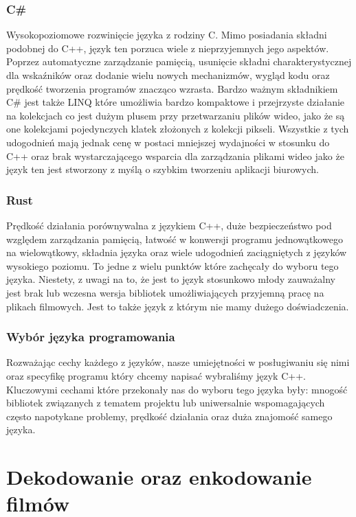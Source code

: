 \documentclass[twoside]{projektInzynierskiMS}
\begin{document}
\subsubsection{C\#}
Wysokopoziomowe rozwinięcie języka z rodziny C. Mimo posiadania składni podobnej do C++, język ten porzuca wiele z nieprzyjemnych jego aspektów. Poprzez automatyczne zarządzanie pamięcią, usunięcie składni charakterystycznej dla wskaźników oraz dodanie wielu nowych mechanizmów, wygląd kodu oraz prędkość tworzenia programów znacząco wzrasta. Bardzo ważnym składnikiem C\# jest także LINQ które umożliwia bardzo kompaktowe i przejrzyste działanie na kolekcjach co jest dużym plusem przy przetwarzaniu plików wideo, jako że są one kolekcjami pojedynczych klatek złożonych z kolekcji pikseli. Wszystkie z tych udogodnień mają jednak cenę w postaci mniejszej wydajności w stosunku do C++ oraz brak wystarczającego wsparcia dla zarządzania plikami wideo jako że język ten jest stworzony z myślą o szybkim tworzeniu aplikacji biurowych. 

\subsubsection{Rust}
Prędkość działania porównywalna z językiem C++, duże bezpieczeństwo pod względem zarządzania pamięcią, łatwość w konwersji programu jednowątkowego na wielowątkowy, składnia języka oraz wiele udogodnień zaciągniętych z języków wysokiego poziomu. To jedne z wielu punktów które zachęcały do wyboru tego języka. Niestety, z uwagi na to, że jest to język stosunkowo młody zauważalny jest brak lub wczesna wersja bibliotek umożliwiających przyjemną pracę na plikach filmowych. Jest to także język z którym nie mamy dużego doświadczenia.

\subsubsection{Wybór języka programowania}
Rozważając cechy każdego z języków, nasze umiejętności w posługiwaniu się nimi oraz specyfikę programu który chcemy napisać wybraliśmy język C++. Kluczowymi cechami które przekonały nas do wyboru tego języka były: mnogość bibliotek związanych z tematem projektu lub uniwersalnie wspomagających często napotykane problemy, prędkość działania oraz duża znajomość samego języka.


\section{Dekodowanie oraz enkodowanie filmów}
\end{document}
